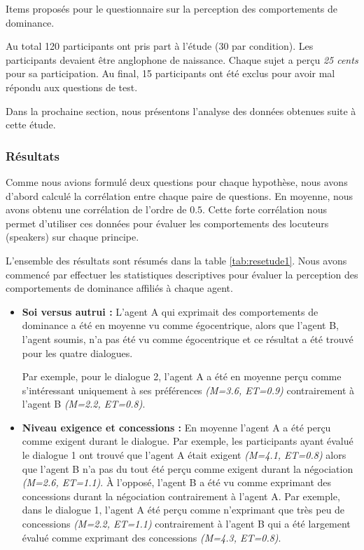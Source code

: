 {\begin{table}[h]
							\caption{Items proposés pour le questionnaire sur la perception des comportements de dominance.}
							\label{table:questionnaire}
						\end{table}
					
					Au total 120 participants ont pris part à l'étude (30 par condition). Les participants devaient être anglophone de naissance. Chaque sujet a perçu \textit{25 cents} pour sa participation. Au final, 15 participants ont été exclus pour avoir mal répondu aux questions de test. 
					
					Dans la prochaine section, nous présentons l'analyse des données obtenues suite à cette étude.
					
					
			\subsubsection{Résultats}
				Comme nous avions formulé deux questions pour chaque hypothèse, nous avons d'abord calculé la corrélation entre chaque paire de questions. En moyenne, nous avons obtenu une corrélation de l'ordre de $0.5$. Cette forte corrélation nous permet d'utiliser ces données pour évaluer les comportements des locuteurs (speakers) sur chaque principe. 
				
				L'ensemble des résultats sont résumés dans la table \ref{tab:resetude1}. Nous avons commencé par effectuer les statistiques descriptives pour évaluer la perception des comportements de dominance affiliés à chaque agent. 
				
				\begin{itemize}     
					
					\item \textbf{Soi versus autrui :} L'agent A qui exprimait des comportements de dominance a été en moyenne vu comme égocentrique, alors que l'agent B, l'agent soumis, n'a pas été vu comme égocentrique et ce résultat a été trouvé pour les quatre dialogues.
					
					Par exemple, pour le dialogue 2, l'agent A a été en moyenne perçu comme s'intéressant uniquement à ses préférences \textit{(M=3.6, ET=0.9)} contrairement à l'agent B \textit{(M=2.2, ET=0.8)}.
					
					\item \textbf{Niveau exigence et concessions :} En moyenne l'agent A a été perçu comme exigent durant le dialogue. Par exemple, les participants ayant évalué le dialogue 1 ont trouvé que l'agent A était exigent \textit{(M=4.1, ET=0.8)} alors que l'agent B n'a pas du tout été perçu comme exigent durant la négociation \textit{(M=2.6, ET=1.1)}. À l'opposé, l'agent B a été vu comme exprimant des concessions durant la négociation contrairement à l'agent A. Par exemple, dans le dialogue 1, l'agent A été perçu comme n'exprimant que très peu de concessions \textit{(M=2.2, ET=1.1)} contrairement à l'agent B qui a été largement évalué comme exprimant des concessions \textit{(M=4.3, ET=0.8)}.
					

\end{itemize}}
